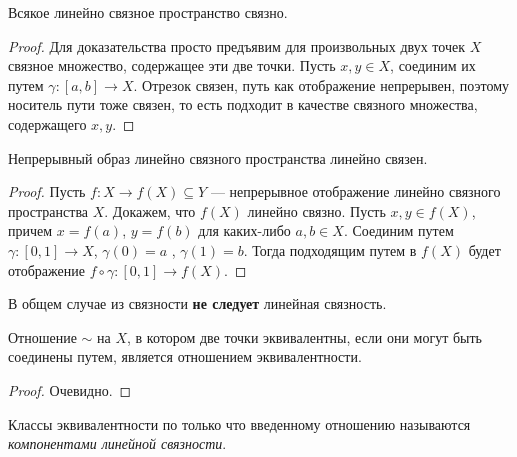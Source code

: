 \begin{theorem}
	Всякое линейно связное пространство связно.
\end{theorem}
\begin{proof}
	Для доказательства просто предъявим для произвольных двух точек $X$
	связное множество, содержащее эти две точки. Пусть $x, y \in X$,
	соединим их путем $\gamma \colon [a, b] \to X$. Отрезок связен,
	путь как отображение непрерывен, поэтому носитель пути тоже связен,
	то есть подходит в качестве связного множества, содержащего $x, y$.
\end{proof}

\begin{theorem}
	Непрерывный образ линейно связного пространства линейно связен.
\end{theorem}
\begin{proof}
	Пусть $f \colon X \to f(X) \subseteq Y$ --- непрерывное отображение
	линейно связного пространства $X$. Докажем, что $f(X)$ линейно связно.
	Пусть $x, y \in f(X)$, причем $x = f(a)$, $y = f(b)$ для каких-либо
	$a, b \in X$. Соединим путем $\gamma \colon [0, 1] \to X$, $\gamma(0) = a$
	, $\gamma(1) = b$. Тогда подходящим путем в $f(X)$ будет отображение 
	$f \circ \gamma \colon [0, 1] \to f(X)$.
\end{proof}

\begin{remark}
	В общем случае из связности \textbf{не следует} линейная связность.
\end{remark}

\begin{remark}
	Отношение $\sim$ на $X$, в котором две точки эквивалентны, если
	они могут быть соединены путем, является отношением эквивалентности.
\end{remark}
\begin{proof}
	Очевидно.
\end{proof}

\begin{definition}
	Классы эквивалентности по только что введенному отношению называются
	\textit{компонентами линейной связности}.
\end{definition}

